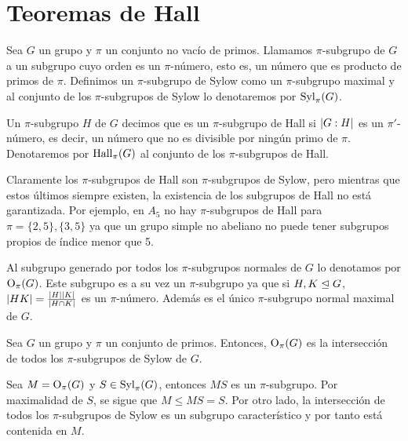 
\chapter{Teoremas de Hall}


\begin{definicion}
	Sea $G$ un grupo y $\pi$ un conjunto no vacío de primos. Llamamos $\pi$-subgrupo de $G$ a un subgrupo cuyo orden es un $\pi$-número, esto es, un número que es producto de primos de $\pi$.
	Definimos un $\pi$-subgrupo de Sylow como un $\pi$-subgrupo maximal y al conjunto de los $\pi$-subgrupos de Sylow lo denotaremos por $\operatorname{Syl}_\pi(G)$.
\end{definicion}
\begin{definicion}
	Un $\pi$-subgrupo $H$ de $G$ decimos que es un $\pi$-subgrupo de Hall si $\left|G:H\right|$ es un $\pi'$-número, es decir, un número que no es divisible por ningún primo de $\pi$. Denotaremos por $\operatorname{Hall}_\pi(G)$ al conjunto de los $\pi$-subgrupos de Hall.
\end{definicion}

\begin{observacion}
	Claramente los $\pi$-subgrupos de Hall son $\pi$-subgrupos de Sylow, pero mientras que estos últimos siempre existen, la existencia de los subgrupos de Hall no está garantizada. Por ejemplo, en $A_5$ no hay $\pi$-subgrupos de Hall para $\pi = \{2,5\}, \{3,5\}$ ya que un grupo simple no abeliano no puede tener subgrupos propios de índice menor que 5.%
\end{observacion}

\begin{definicion}
	Al subgrupo generado por todos los $\pi$-subgrupos normales de $G$ lo denotamos por $\operatorname{O}_\pi(G)$. Este subgrupo es a su vez un $\pi$-subgrupo ya que si $H,K\trianglelefteq G$, $\left|HK\right| = \frac{\left|H\right|\left|K\right|}{\left|H\cap K\right|}$ es un $\pi$-número. Además es el único $\pi$-subgrupo normal maximal de $G$.
\end{definicion}

\begin{proposicion}\label{prop:coreint}%
	Sea $G$ un grupo y $\pi$ un conjunto de primos. Entonces, $\operatorname{O}_\pi(G)$ es la intersección de todos los $\pi$-subgrupos de Sylow de $G$.
	\begin{demostracion}
		Sea $M=\operatorname{O}_\pi(G)$ y $S\in \operatorname{Syl}_\pi(G)$, entonces $MS$ es un $\pi$-subgrupo. Por maximalidad de $S$, se sigue que $M\leq MS = S$. Por otro lado, la intersección de todos los $\pi$-subgrupos de Sylow es un subgrupo característico y por tanto está contenida en $M$.
	\end{demostracion}
\end{proposicion}

